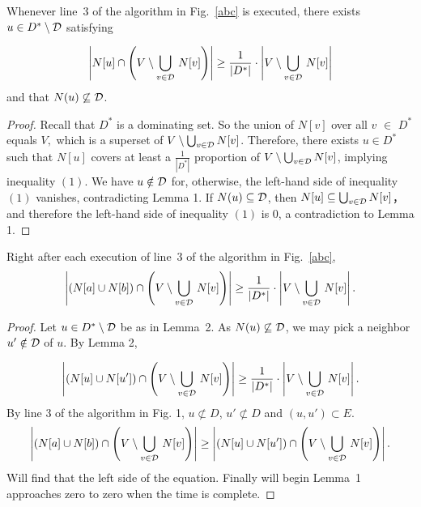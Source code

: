 \documentclass[12pt]{article}
\begin{document}
\begin{lemma}
Whenever line~3 of the algorithm in Fig.~\ref{abc} is executed,
there exists $u\in D^*\setminus {\cal D}$ satisfying

\begin{equation}
\left|N[u]\cap \left(V\setminus \bigcup_{v\in {\cal D}}\,N[v]\right)\right|
\ge \frac{1}{|D^*|}
\cdot\left|V\setminus \bigcup_{v\in {\cal D}}\,N[v]\right|
\label{lemma2-equation}
\end{equation}
and that $N(u)\not\subseteq {\cal D}$.
\end{lemma}

\begin{proof}
Recall that $D^*$ is a dominating set. So the union of $N[v]$ over all $v$ $\in$ $D^*$ equals $V, $ which is a superset of $V\setminus \bigcup_{v\in{\cal D}} N[v]$. Therefore, there exists $u\in D^*$ such that $N[u]$ covers at least a $\frac{1}{|D^*|}$ proportion of $V\setminus \bigcup_{v\in{\cal D}} N[v]$, implying inequality $(1)$. We have $u\notin {\cal D}$ for, otherwise, the left-hand side of inequality $(1)$ vanishes, contradicting Lemma 1.
If $N(u)\subseteq {\cal D}$,  then $N[u]\subseteq \bigcup_{v\in {\cal D}} N[v]$， and therefore the left-hand side of inequality $(1)$ is 0, a contradiction to Lemma 1.
\end{proof}



\clearpage

\begin{lemma}
Right after each execution of line~3 of the algorithm in Fig.~\ref{abc},
\begin{equation}
\left|\left(N[a]\cup N[b]\right)\cap \left(V\setminus \bigcup_{v\in {\cal D}}\,N[v]\right)\right|
\ge \frac{1}{|D^*|}
\cdot\left|V\setminus \bigcup_{v\in {\cal D}}\,N[v]\right|.
\end{equation}
\end{lemma}
\begin{proof}
Let $u\in D^*\setminus {\cal D}$ be as in Lemma~2. As $N(u)\not\subseteq {\cal D}$, we may pick a neighbor $u'\notin {\cal D}$ of $u$. By Lemma 2,

\begin{equation}
\left|\left(N[u]\cup N[u']\right)\cap \left(V\setminus \bigcup_{v\in {\cal D}}\,N[v]\right)\right|
\ge \frac{1}{|D^*|}
\cdot\left|V\setminus \bigcup_{v\in {\cal D}}\,N[v]\right|.
\end{equation}
By line 3 of the algorithm in Fig. 1, $u \not\subset D$, $u'\not\subset D$ and $(u,u')\subset E.$
\begin{equation}
\left|\left(N[a]\cup N[b]\right)\cap \left(V\setminus \bigcup_{v\in {\cal D}}\,N[v]\right)\right| \geq \left|\left(N[u]\cup N[u']\right)\cap \left(V\setminus \bigcup_{v\in {\cal D}}\,N[v]\right)\right|.
\end{equation}
Will find that the left side of the equation. Finally will begin Lemma~1 approaches zero to zero when the time is complete.
\end{proof}
\end{document}
